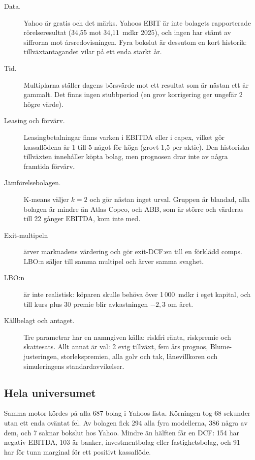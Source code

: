 \begin{description}
  \item[Data.] Yahoo är gratis och det märks. Yahoos EBIT är inte bolagets rapporterade
    rörelseresultat (34,55 mot 34,11~mdkr 2025), och ingen har stämt av siffrorna mot
    årsredovisningen. Fyra bokslut är dessutom en kort historik: tillväxtantagandet vilar på
    ett enda starkt år.
  \item[Tid.] Multiplarna ställer dagens börsvärde mot ett resultat som är nästan ett år
    gammalt. Det finns ingen stubbperiod (en grov korrigering ger ungefär 2\kr{} högre värde).
  \item[Leasing och förvärv.] Leasingbetalningar finns varken i EBITDA eller i capex, vilket
    gör kassaflödena år 1 till 5 något för höga (grovt 1,5\kr{} per aktie). Den historiska
    tillväxten innehåller köpta bolag, men prognosen drar inte av några framtida förvärv.
  \item[Jämförelsebolagen.] K-means väljer $k = 2$ och gör nästan inget urval. Gruppen är
    blandad, alla bolagen är mindre än Atlas Copco, och ABB, som är större och värderas till
    22 gånger EBITDA, kom inte med.
  \item[Exit-multipeln] ärver marknadens värdering och gör exit-DCF:en till en förklädd comps.
    LBO:n säljer till samma multipel och ärver samma svaghet.
  \item[LBO:n] är inte realistisk: köparen skulle behöva över 1\,000~mdkr i eget kapital, och
    till kurs plus 30\pct{} premie blir avkastningen $-2,3$\pct{} om året.
  \item[Källbelagt och antaget.] Tre parametrar har en namngiven källa: riskfri ränta,
    riskpremie och skattesats. Allt annat är val: 2\pct{} evig tillväxt, fem års prognos,
    Blume-justeringen, storlekspremien, alla golv och tak, lånevillkoren och simuleringens
    standardavvikelser.
\end{description}

\subsection{Hela universumet}

Samma motor kördes på alla 687 bolag i Yahoos lista. Körningen tog 68 sekunder utan ett enda
oväntat fel. Av bolagen fick 294 alla fyra modellerna, 386 några av dem, och 7 saknar bokslut
hos Yahoo. Mindre än hälften får en DCF: 154 har negativ EBITDA, 103 är banker, investmentbolag
eller fastighetsbolag, och 91 har för tunn marginal för ett positivt kassaflöde.

